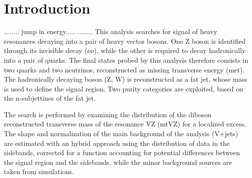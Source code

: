 \chapter{Introduction}

........
jump in energy.....
........
This analysis searches for signal of heavy resonances decaying into a pair of heavy vector bosons. 
One Z boson is identified through its invisible decay ($\nu \nu$), while the other is required to decay hadronically into a pair of quarks.
The final states probed by this analysis therefore consists in two quarks and two neutrinos, reconstructed as missing transverse energy (met).
The hadronically decaying boson (Z, W) is reconstructed as a fat jet, whose mass is used to define the signal region.
Two purity categories are exploited, based on the n-subjettines of the fat jet.

The search is performed by examining the distribution of the diboson reconstructed transverse mass of the resonance VZ (mtVZ) for a localized excess. 
The shape and normalization of the main background of the analysis (V+jets) are estimated with an hybrid approach using the distribution of data in the sidebands, corrected for a function accounting for potential differences between the signal region and the sidebands, while the minor background sources are taken from simulations.


